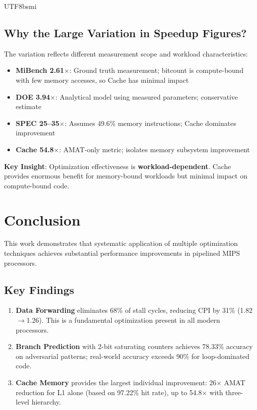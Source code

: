 \documentclass[journal,twoside]{IEEEtran}
\begin{document}
\begin{CJK}{UTF8}{bsmi}
\subsection{Why the Large Variation in Speedup Figures?}
The variation reflects different measurement scope and workload characteristics:
\begin{itemize}
    \item \textbf{MiBench 2.61$\times$}: Ground truth measurement; bitcount is compute-bound with few memory accesses, so Cache has minimal impact
    \item \textbf{DOE 3.94$\times$}: Analytical model using measured parameters; conservative estimate
    \item \textbf{SPEC 25--35$\times$}: Assumes 49.6\% memory instructions; Cache dominates improvement
    \item \textbf{Cache 54.8$\times$}: AMAT-only metric; isolates memory subsystem improvement
\end{itemize}

\textbf{Key Insight}: Optimization effectiveness is \textbf{workload-dependent}. Cache provides enormous benefit for memory-bound workloads but minimal impact on compute-bound code.

\section{Conclusion}

This work demonstrates that systematic application of multiple optimization techniques achieves substantial performance improvements in pipelined MIPS processors.

\subsection{Key Findings}
\begin{enumerate}
\item \textbf{Data Forwarding} eliminates 68\% of stall cycles, reducing CPI by 31\% (1.82$\rightarrow$1.26). This is a fundamental optimization present in all modern processors.

\item \textbf{Branch Prediction} with 2-bit saturating counters achieves 78.33\% accuracy on adversarial patterns; real-world accuracy exceeds 90\% for loop-dominated code.

\item \textbf{Cache Memory} provides the largest individual improvement: 26$\times$ AMAT reduction for L1 alone (based on 97.22\% hit rate), up to 54.8$\times$ with three-level hierarchy.


\end{enumerate}
\end{CJK}
\end{document}
